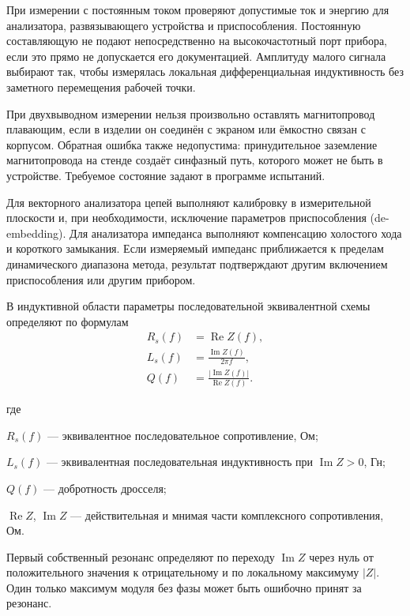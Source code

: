 \documentclass[14pt,a4paper]{extarticle}
\newenvironment{whereblock}
 {\par\noindent где\par
  \begin{list}{}{\setlength{\leftmargin}{12.5mm}
                  \setlength{\itemindent}{-12.5mm}
                  \setlength{\itemsep}{0pt}
                  \setlength{\parsep}{0pt}
                  \setlength{\topsep}{0pt}}}
 {\end{list}}
\newcommand{\whereitem}[2]{\item[] #1 --- #2}
\begin{document}
При измерении с постоянным током проверяют допустимые ток и энергию для
анализатора, развязывающего устройства и приспособления. Постоянную
составляющую не подают непосредственно на высокочастотный порт прибора, если
это прямо не допускается его документацией. Амплитуду малого сигнала выбирают
так, чтобы измерялась локальная дифференциальная индуктивность без заметного
перемещения рабочей точки.

При двухвыводном измерении нельзя произвольно оставлять магнитопровод
плавающим, если в изделии он соединён с экраном или ёмкостно связан с
корпусом. Обратная ошибка также недопустима: принудительное заземление
магнитопровода на стенде создаёт синфазный путь, которого может не быть в
устройстве. Требуемое состояние задают в программе испытаний.

Для векторного анализатора цепей выполняют калибровку в измерительной
плоскости и, при необходимости, исключение параметров приспособления
(de-embedding). Для анализатора импеданса выполняют компенсацию холостого
хода и короткого замыкания. Если измеряемый импеданс приближается к пределам
динамического диапазона метода, результат подтверждают другим включением
приспособления или другим прибором.

В индуктивной области параметры последовательной эквивалентной схемы
определяют по формулам
\begin{align}
 R_s(f)&=\operatorname{Re}Z(f),
 \label{eq:series-resistance-from-z}\\
 L_s(f)&=\frac{\operatorname{Im}Z(f)}{2\pi f},
 \label{eq:series-inductance-from-z}\\
 Q(f)&=\frac{|\operatorname{Im}Z(f)|}{\operatorname{Re}Z(f)}.
 \label{eq:q-from-z}
\end{align}
\begin{whereblock}
\whereitem{$R_s(f)$}{эквивалентное последовательное сопротивление, Ом;}
\whereitem{$L_s(f)$}{эквивалентная последовательная индуктивность при
$\operatorname{Im}Z>0$, Гн;}
\whereitem{$Q(f)$}{добротность дросселя;}
\whereitem{$\operatorname{Re}Z$, $\operatorname{Im}Z$}{действительная и
мнимая части комплексного сопротивления, Ом.}
\end{whereblock}

Первый собственный резонанс определяют по переходу
$\operatorname{Im}Z$ через нуль от положительного значения к отрицательному
и по локальному максимуму $|Z|$. Один только максимум модуля без фазы может
быть ошибочно принят за резонанс.
\end{document}
